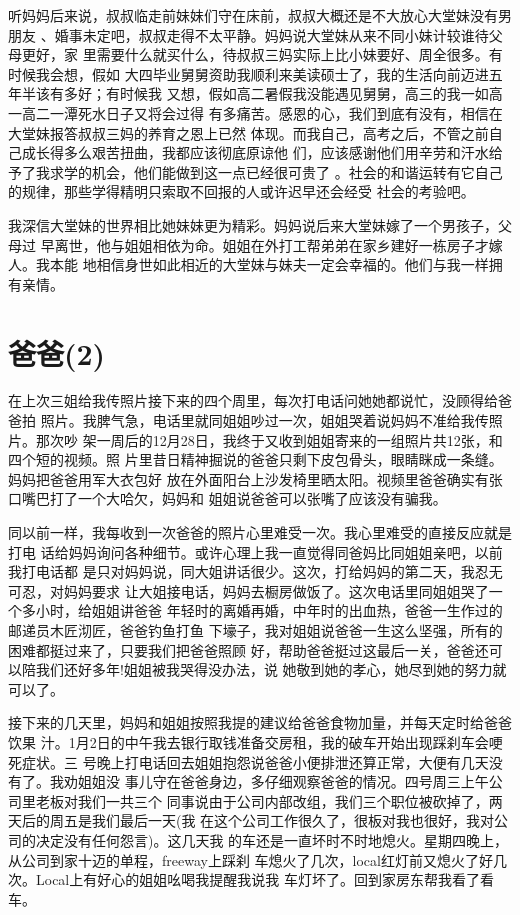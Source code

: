 \documentclass[12pt]{book}
\begin{document}
听妈妈后来说，叔叔临走前妹妹们守在床前，叔叔大概还是不大放心大堂妹没有男朋友
、婚事未定吧，叔叔走得不太平静。妈妈说大堂妹从来不同小妹计较谁待父母更好，家
里需要什么就买什么，待叔叔三妈实际上比小妹要好、周全很多。有时候我会想，假如
大四毕业舅舅资助我顺利来美读硕士了，我的生活向前迈进五年半该有多好；有时候我
又想，假如高二暑假我没能遇见舅舅，高三的我一如高一高二一潭死水日子又将会过得
有多痛苦。感恩的心，我们到底有没有，相信在大堂妹报答叔叔三妈的养育之恩上已然
体现。而我自己，高考之后，不管之前自己成长得多么艰苦扭曲，我都应该彻底原谅他
们，应该感谢他们用辛劳和汗水给予了我求学的机会，他们能做到这一点已经很可贵了
。社会的和谐运转有它自己的规律，那些学得精明只索取不回报的人或许迟早还会经受
社会的考验吧。

我深信大堂妹的世界相比她妹妹更为精彩。妈妈说后来大堂妹嫁了一个男孩子，父母过
早离世，他与姐姐相依为命。姐姐在外打工帮弟弟在家乡建好一栋房子才嫁人。我本能
地相信身世如此相近的大堂妹与妹夫一定会幸福的。他们与我一样拥有亲情。
\section{爸爸(2)}
\label{sec-9-40}

在上次三姐给我传照片接下来的四个周里，每次打电话问她她都说忙，没顾得给爸爸拍
照片。我脾气急，电话里就同姐姐吵过一次，姐姐哭着说妈妈不准给我传照片。那次吵
架一周后的12月28日，我终于又收到姐姐寄来的一组照片共12张，和四个短的视频。照
片里昔日精神掘说的爸爸只剩下皮包骨头，眼睛眯成一条缝。妈妈把爸爸用军大衣包好
放在外面阳台上沙发椅里晒太阳。视频里爸爸确实有张口嘴巴打了一个大哈欠，妈妈和
姐姐说爸爸可以张嘴了应该没有骗我。

同以前一样，我每收到一次爸爸的照片心里难受一次。我心里难受的直接反应就是打电
话给妈妈询问各种细节。或许心理上我一直觉得同爸妈比同姐姐亲吧，以前我打电话都
是只对妈妈说，同大姐讲话很少。这次，打给妈妈的第二天，我忍无可忍，对妈妈要求
让大姐接电话，妈妈去橱房做饭了。这次电话里同姐姐哭了一个多小时，给姐姐讲爸爸
年轻时的离婚再婚，中年时的出血热，爸爸一生作过的邮递员木匠沏匠，爸爸钓鱼打鱼
下壕子，我对姐姐说爸爸一生这么坚强，所有的困难都挺过来了，只要我们把爸爸照顾
好，帮助爸爸挺过这最后一关，爸爸还可以陪我们还好多年!姐姐被我哭得没办法，说
她敬到她的孝心，她尽到她的努力就可以了。

接下来的几天里，妈妈和姐姐按照我提的建议给爸爸食物加量，并每天定时给爸爸饮果
汁。1月2日的中午我去银行取钱准备交房租，我的破车开始出现踩刹车会哽死症状。三
号晚上打电话回去姐姐抱怨说爸爸小便排泄还算正常，大便有几天没有了。我劝姐姐没
事儿守在爸爸身边，多仔细观察爸爸的情况。四号周三上午公司里老板对我们一共三个
同事说由于公司内部改组，我们三个职位被砍掉了，两天后的周五是我们最后一天(我
在这个公司工作很久了，很板对我也很好，我对公司的决定没有任何怨言)。这几天我
的车还是一直坏时不时地熄火。星期四晚上，从公司到家十迈的单程，freeway上踩刹
车熄火了几次，local红灯前又熄火了好几次。Local上有好心的姐姐吆喝我提醒我说我
车灯坏了。回到家房东帮我看了看车。
\end{document}
